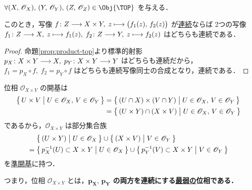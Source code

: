 \documentclass[geometry_main]{subfiles}
\begin{document}
\begin{mycol}[label=col:continuous-product]{}
	$\forall \phase{X},\, \phase{Y},\, \phase{Z} \in \Obj{\TOP}$ を与える．

	このとき，写像 $f \colon Z \longrightarrow X \times Y,\; z \longmapsto \bigl( f_1(z),\, f_2(z) \bigr) $ が\hyperref[def.continuous]{連続}ならば
	2つの写像 $f_1 \colon Z \longrightarrow X,\; z \longmapsto f_1(z),\; f_2 \colon Z \longrightarrow Y,\; z \longmapsto f_2(z)$ はどちらも連続である．
\end{mycol}

\begin{proof}
	命題\ref{prop:product-top}より標準的射影 $p_X \colon X \times Y \longrightarrow X,\; p_Y \colon X \times Y \longrightarrow Y$ はどちらも連続だから，
	$f_1 = p_X \circ f,\; f_2 = p_Y \circ f$ はどちらも連続写像同士の合成となり，連続である．
\end{proof}

位相 $\mathscr{O}_{X \times Y}$ の開基は
\begin{align}
	\bigl\{\, U \times V \bigm| U \in \mathscr{O}_X,\, V \in \mathscr{O}_Y \,\bigr\} 
	&=\bigl\{\, (U \cap X) \times (V \cap Y) \bigm| U \in \mathscr{O}_X,\, V \in \mathscr{O}_Y \,\bigr\} \\
	&= \bigl\{\, (U \times Y) \cap (X \times V) \bigm| U \in \mathscr{O}_X,\, V \in \mathscr{O}_Y \,\bigr\} 
\end{align}
であるから，$\mathscr{O}_{X \times Y}$ は部分集合族
\begin{align}
	&\bigl\{\, (U \times Y) \bigm| U \in \mathscr{O}_X \,\bigr\} \cup \bigl\{\, (X \times V) \bigm| V \in \mathscr{O}_Y \,\bigr\} \\
	=\; &\bigl\{\, p_X^{-1}(U) \subset X \times Y \bigm| U \in \mathscr{O}_X \,\bigr\} \cup \bigl\{\, p_Y^{-1}(V) \subset X \times Y \bigm| V \in \mathscr{O}_Y \,\bigr\} 
\end{align}
を\hyperref[def:subbase]{準開基}に持つ．

\begin{marker}\label{remark:product}
	つまり，位相 $\mathscr{O}_{X \times Y}$ とは，\textbf{$\bm{p_X},\, \bm{p_Y}$ の両方を連続にする\hyperref[def.intensity_topo]{最弱の}位相である．}
\end{marker}


\end{document}
